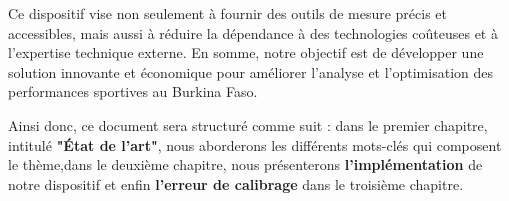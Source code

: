   Ce dispositif vise non seulement à fournir des outils de mesure précis et accessibles, mais aussi à réduire la dépendance à des technologies coûteuses et à l'expertise technique externe. En somme, notre objectif est de développer une solution innovante et économique pour améliorer l'analyse et l'optimisation des performances sportives au Burkina Faso.
  
  Ainsi donc, ce document sera structuré comme suit : dans le premier chapitre, intitulé \textbf{"État de l'art"}, nous aborderons les différents mots-clés qui composent le thème,dans le deuxième chapitre, nous présenterons  \textbf{l'implémentation} de notre dispositif et enfin \textbf{l'erreur de calibrage} dans le troisième chapitre.
  
  
  
  
  
  
  